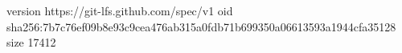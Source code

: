 version https://git-lfs.github.com/spec/v1
oid sha256:7b7c76ef09b8e93c9cea476ab315a0fdb71b699350a06613593a1944cfa35128
size 17412
